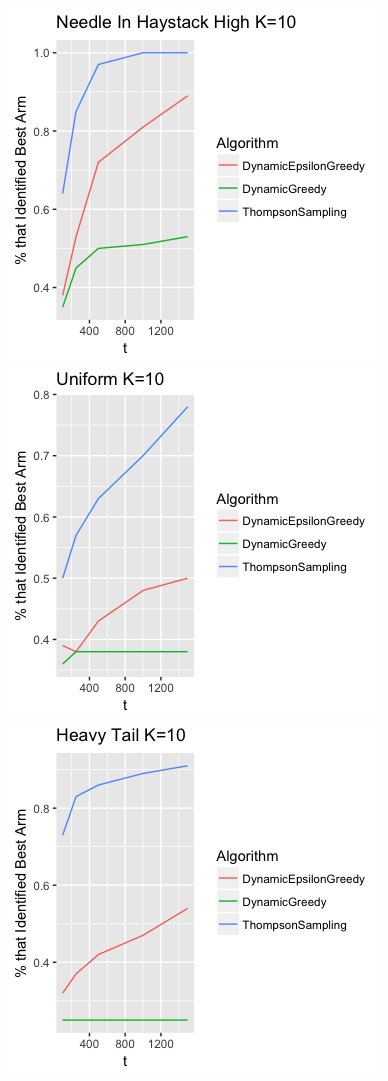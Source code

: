 \documentclass[11pt,letterpaper]{article}
\begin{document}
\includegraphics[scale=0.5]{preliminary_nih_10_arms} \\
\includegraphics[scale=0.5]{preliminary_best_arm_uniform_10} 
\includegraphics[scale=0.5]{preliminary_best_arm_heavy_tail_10}
\end{document}
